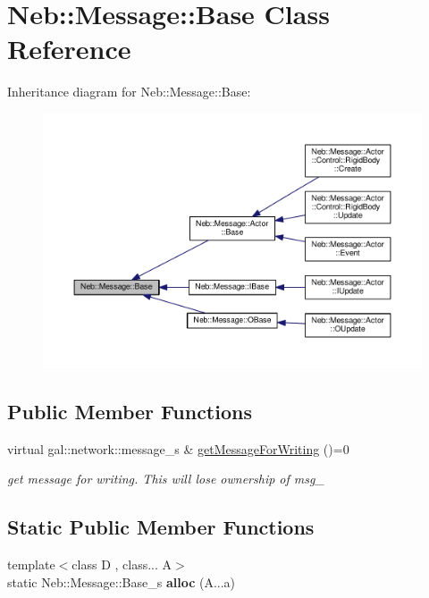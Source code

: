 \hypertarget{classNeb_1_1Message_1_1Base}{\section{Neb\-:\-:Message\-:\-:Base Class Reference}
\label{classNeb_1_1Message_1_1Base}
}


Inheritance diagram for Neb\-:\-:Message\-:\-:Base\-:
\nopagebreak
\begin{figure}[H]
\begin{center}
\leavevmode
\includegraphics[width=350pt]{classNeb_1_1Message_1_1Base__inherit__graph}
\end{center}
\end{figure}
\subsection*{Public Member Functions}
\begin{DoxyCompactItemize}
\item 
\hypertarget{classNeb_1_1Message_1_1Base_ab48d95424c8cd0e6d49e2913065bd32a}{virtual gal\-::network\-::message\-\_\-s \& \hyperlink{classNeb_1_1Message_1_1Base_ab48d95424c8cd0e6d49e2913065bd32a}{get\-Message\-For\-Writing} ()=0}\label{classNeb_1_1Message_1_1Base_ab48d95424c8cd0e6d49e2913065bd32a}

\begin{DoxyCompactList}\small\item\em get message for writing. This will lose ownership of {\ttfamily msg\-\_\-} \end{DoxyCompactList}\end{DoxyCompactItemize}
\subsection*{Static Public Member Functions}
\begin{DoxyCompactItemize}
\item 
\hypertarget{classNeb_1_1Message_1_1Base_ad2336e4055a84d48220650b4ad8b2be9}{{\footnotesize template$<$class D , class... A$>$ }\\static Neb\-::\-Message\-::\-Base\-\_\-s {\bfseries alloc} (A...\-a)}\label{classNeb_1_1Message_1_1Base_ad2336e4055a84d48220650b4ad8b2be9}

\end{DoxyCompactItemize}
